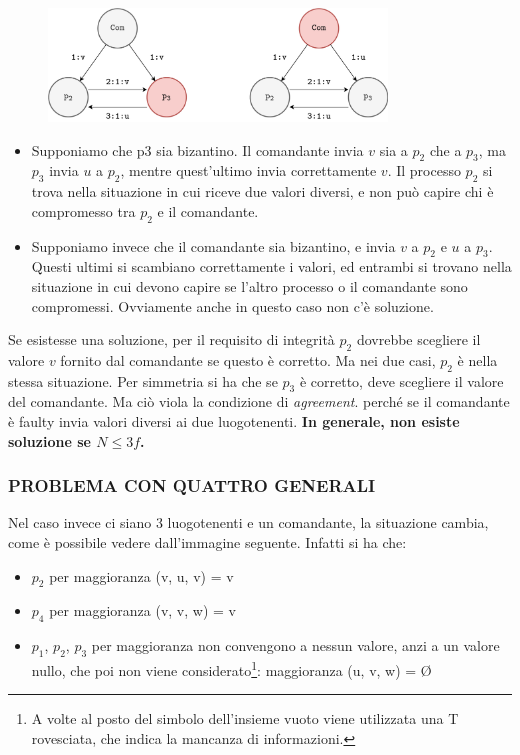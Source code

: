 \begin{figure}[ht]
    \centering
    \includegraphics[width=9cm]{./Images/cap2/2.4.png}
    \label{fig:image2.4}
\end{figure}

\begin{itemize}
    \item Supponiamo che p3 sia bizantino. Il comandante invia $v$ sia a $p_{2}$ che a $p_{3}$, ma $p_{3}$ invia $u$ a $p_{2}$, mentre quest'ultimo invia correttamente $v$. Il processo $p_{2}$ si trova nella situazione in cui riceve due valori diversi, e non può capire chi è compromesso tra $p_{2}$ e il comandante.
    \item Supponiamo invece che il comandante sia bizantino, e invia $v$ a $p_{2}$ e $u$ a $p_{3}$. Questi ultimi si scambiano correttamente i valori, ed entrambi si trovano nella situazione in cui devono capire se l'altro processo o il comandante sono compromessi. Ovviamente anche in questo caso non c'è soluzione.
\end{itemize}
Se esistesse una soluzione, per il requisito di integrità $p_{2}$ dovrebbe scegliere il valore $v$ fornito dal comandante se questo è corretto. Ma nei due casi, $p_{2}$ è nella stessa situazione. Per simmetria si ha che se $p_{3}$ è corretto, deve scegliere il valore del comandante. Ma ciò viola la condizione di \textit{agreement}. perché se il comandante è faulty invia valori diversi ai due luogotenenti. \newline
\textbf{In generale, non esiste soluzione se $N \leq 3f$.}
\subsubsection{PROBLEMA CON QUATTRO GENERALI}
Nel caso invece ci siano 3 luogotenenti e un comandante, la situazione cambia, come è possibile vedere dall'immagine seguente. Infatti si ha che:
\begin{itemize}
    \item $p_{2}$ per maggioranza (v, u, v) = v
    \item $p_{4}$ per maggioranza (v, v, w) = v
    \item $p_{1}$, $p_{2}$, $p_{3}$ per maggioranza non convengono a nessun valore, anzi a un valore nullo, che poi non viene considerato\footnote{A volte al posto del simbolo dell'insieme vuoto viene utilizzata una T rovesciata, che indica la mancanza di informazioni.}: maggioranza (u, v, w) = Ø
\end{itemize}

